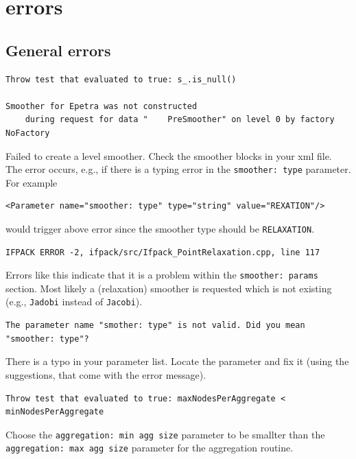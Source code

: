 \documentclass[10pt,fleqn]{book}
\begin{document}
\section{\muelu errors}

\subsection{General errors}

\begin{cBox}
\begin{lstlisting}
Throw test that evaluated to true: s_.is_null()

Smoother for Epetra was not constructed
    during request for data "    PreSmoother" on level 0 by factory NoFactory
\end{lstlisting}
\end{cBox}
Failed to create a level smoother. Check the smoother blocks in your xml file.
The error occurs, e.g., if there is a typing error in the \verb|smoother: type| parameter.
For example
\begin{lstlisting}
<Parameter name="smoother: type" type="string" value="REXATION"/>
\end{lstlisting}
would trigger above error since the smoother type should be \verb|RELAXATION|.

\begin{cBox}
\begin{lstlisting}
IFPACK ERROR -2, ifpack/src/Ifpack_PointRelaxation.cpp, line 117
\end{lstlisting}
\end{cBox}
Errors like this indicate that it is a problem within the \verb|smoother: params| section. Most likely a (relaxation) smoother is requested which is not existing (e.g., \verb|Jadobi| instead of \verb|Jacobi|).

\begin{cBox}
\begin{lstlisting}
The parameter name "smother: type" is not valid. Did you mean "smoother: type"?
\end{lstlisting}
\end{cBox}
There is a typo in your parameter list. Locate the parameter and fix it (using the suggestions, that come with the error message).

\begin{cBox}
\begin{lstlisting}
Throw test that evaluated to true: maxNodesPerAggregate < minNodesPerAggregate
\end{lstlisting}
\end{cBox}
Choose the \verb|aggregation: min agg size| parameter to be smallter than the \verb|aggregation: max agg size| parameter for the aggregation routine.
\end{document}
